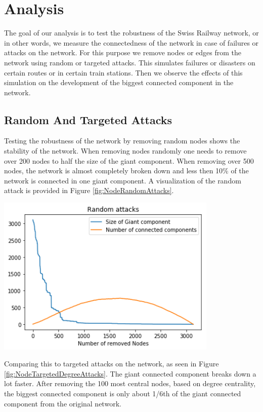 \documentclass{Resources/netsci-project}
\begin{document}
\section{Analysis}
The goal of our analysis is to test the robustness of the Swiss Railway network, or in other words, we measure the connectedness of the network in case of failures or attacks on the network. For this purpose we remove nodes or edges from the network using random or targeted attacks. This simulates failures or disasters on certain routes or in certain train stations. Then we observe the effects of this simulation on the development of the biggest connected component in the network.  

\subsection{Random And Targeted Attacks}
Testing the robustness of the network by removing random nodes shows the stability of the network. When removing nodes randomly one needs to remove over 200 nodes to half the size of the giant component. When removing over 500 nodes, the network is almost completely broken down and less then 10\% of the network is connected in one giant component. A visualization of the random attack is provided in Figure \ref{fig:NodeRandomAttacks}.

\begin{center}
    \centering
    \includegraphics[width=300pt]{Resources/node_random_attacks}
    \label{fig:NodeRandomAttacks}
\end{center}
\noindent
Comparing this to targeted attacks on the network, as seen in Figure \ref{fig:NodeTargetedDegreeAttacks}. The giant connected component breaks down a lot faster. After removing the 100 most central nodes, based on degree centrality, the biggest connected component is only about 1/6th of the giant connected component from the original network.
\end{document}
